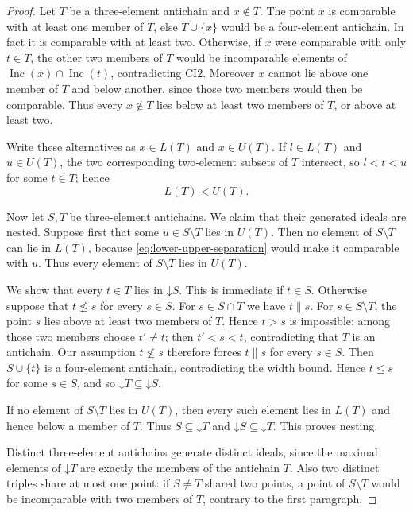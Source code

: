 \documentclass[11pt]{article}
\numberwithin{equation}{section}
\theoremstyle{definition}
\theoremstyle{remark}
\newcommand{\Inc}{\operatorname{Inc}}
\newcommand{\down}{\mathord{\downarrow}}
\begin{document}
\begin{proof}
Let $T$ be a three-element antichain and $x\notin T$.  The point $x$ is
comparable with at least one member of $T$, else $T\cup\{x\}$ would be a
four-element antichain.  In fact it is comparable with at least two.
Otherwise, if $x$ were comparable with only $t\in T$, the other two
members of $T$ would be incomparable elements of
$\Inc(x)\cap\Inc(t)$, contradicting $\mathrm{CI2}$.  Moreover $x$ cannot
lie above one member of $T$ and below another, since those two members
would then be comparable.  Thus every $x\notin T$ lies below at least two
members of $T$, or above at least two.

Write these alternatives as $x\in L(T)$ and $x\in U(T)$.  If
$l\in L(T)$ and $u\in U(T)$, the two corresponding two-element subsets of
$T$ intersect, so $l<t<u$ for some $t\in T$; hence
\begin{equation}\label{eq:lower-upper-separation}
L(T)<U(T).
\end{equation}

Now let $S,T$ be three-element antichains.  We claim that their generated
ideals are nested.  Suppose first that some $u\in S\setminus T$ lies in
$U(T)$.  Then no element of $S\setminus T$ can lie in $L(T)$, because
\eqref{eq:lower-upper-separation} would make it comparable with $u$.  Thus every element of
$S\setminus T$ lies in $U(T)$.

We show that every $t\in T$ lies in $\down S$.  This is immediate if
$t\in S$.  Otherwise suppose that $t\not\le s$ for every $s\in S$.
For $s\in S\cap T$ we have $t\parallel s$.  For
$s\in S\setminus T$, the point $s$ lies above at least two members of
$T$.  Hence $t>s$ is impossible: among those two members choose
$t'\ne t$; then $t'<s<t$, contradicting that $T$ is an antichain.
Our assumption $t\not\le s$ therefore forces $t\parallel s$ for every
$s\in S$.  Then $S\cup\{t\}$ is a four-element antichain, contradicting
the width bound.  Hence $t\le s$ for some $s\in S$, and so
$\down T\subseteq\down S$.

If no element of $S\setminus T$ lies in $U(T)$, then every such element
lies in $L(T)$ and hence below a member of $T$.  Thus
$S\subseteq\down T$ and $\down S\subseteq\down T$.  This proves nesting.

Distinct three-element antichains generate distinct ideals, since the
maximal elements of $\down T$ are exactly the members of the antichain
$T$.  Also two distinct triples share at most one point: if $S\ne T$
shared two points, a point of $S\setminus T$ would be incomparable with
two members of $T$, contrary to the first paragraph.


\end{proof}
\end{document}
